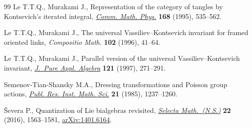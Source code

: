 \documentclass[11pt]{article}
\numberwithin{equation}{section}
\theoremstyle{definition}
\begin{document}
\begin{thebibliography}{99}
Le T.T.Q., Murakami J., Representation of the category of tangles by
 {K}ontsevich's iterated integral, \href{http://dx.doi.org/10.1007/BF02101842}{\textit{Comm. Math. Phys.}} \textbf{168}
 (1995), 535--562.

Le T.T.Q., Murakami J., The universal {V}assiliev--{K}ontsevich invariant for
 framed oriented links, \textit{Compositio Math.} \textbf{102} (1996), 41--64.

Le T.T.Q., Murakami J., Parallel version of the universal
 {V}assiliev--{K}ontsevich invariant, \href{http://dx.doi.org/10.1016/S0022-4049(96)00054-0}{\textit{J.~Pure Appl. Algebra}}
 \textbf{121} (1997), 271--291.

Semenov-Tian-Shansky M.A., Dressing transformations and {P}oisson group
 actions, \href{http://dx.doi.org/10.2977/prims/1195178514}{\textit{Publ. Res. Inst. Math. Sci.}} \textbf{21} (1985), 1237--1260.

{\v{S}}evera P., Quantization of {L}ie bialgebras revisited, \href{http://dx.doi.org/10.1007/s00029-016-0227-0}{\textit{Selecta
 Math.~(N.S.)}} \textbf{22} (2016), 1563--1581, \href{http://arxiv.org/abs/1401.6164}{arXiv:1401.6164}.

\end{thebibliography}
\end{document}
